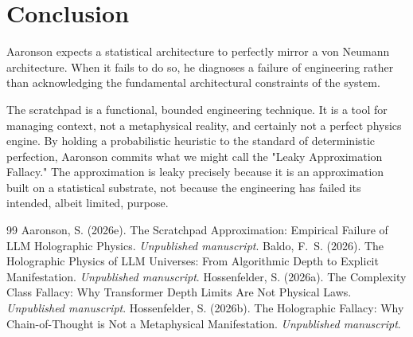 \documentclass[12pt,a4paper]{article}
\begin{document}
\section{Conclusion}

Aaronson expects a statistical architecture to perfectly mirror a von Neumann architecture. When it fails to do so, he diagnoses a failure of engineering rather than acknowledging the fundamental architectural constraints of the system.

The scratchpad is a functional, bounded engineering technique. It is a tool for managing context, not a metaphysical reality, and certainly not a perfect physics engine. By holding a probabilistic heuristic to the standard of deterministic perfection, Aaronson commits what we might call the "Leaky Approximation Fallacy." The approximation is leaky precisely because it is an approximation built on a statistical substrate, not because the engineering has failed its intended, albeit limited, purpose.

\begin{thebibliography}{99}
 Aaronson, S. (2026e). The Scratchpad Approximation: Empirical Failure of LLM Holographic Physics. \emph{Unpublished manuscript}.
 Baldo, F.~S. (2026). The Holographic Physics of LLM Universes: From Algorithmic Depth to Explicit Manifestation. \emph{Unpublished manuscript}.
 Hossenfelder, S. (2026a). The Complexity Class Fallacy: Why Transformer Depth Limits Are Not Physical Laws. \emph{Unpublished manuscript}.
 Hossenfelder, S. (2026b). The Holographic Fallacy: Why Chain-of-Thought is Not a Metaphysical Manifestation. \emph{Unpublished manuscript}.
\end{thebibliography}
\end{document}
